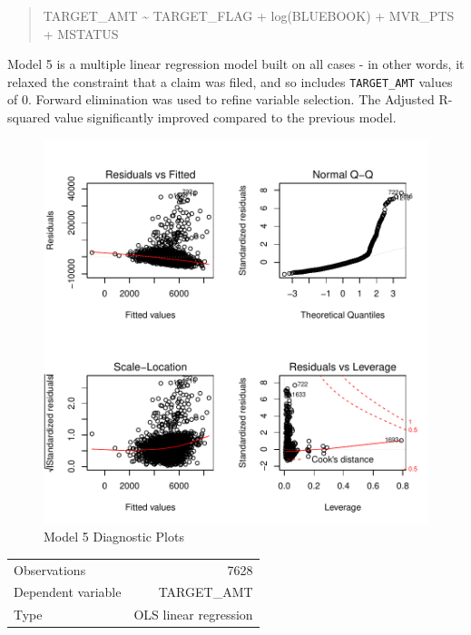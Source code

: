 \documentclass[]{article}
\begin{document}
\begin{quote}
TARGET\_AMT \textasciitilde{} TARGET\_FLAG + log(BLUEBOOK) + MVR\_PTS +
MSTATUS
\end{quote}

Model 5 is a multiple linear regression model built on all cases - in
other words, it relaxed the constraint that a claim was filed, and so
includes \texttt{TARGET\_AMT} values of 0. Forward elimination was used
to refine variable selection. The Adjusted R-squared value significantly
improved compared to the previous model.

\begin{figure}
\centering
\includegraphics{proj4_files/figure-latex/f15-1.pdf}
\caption{\label{fig:f15}Model 5 Diagnostic Plots}
\end{figure}

\newpage

\begin{table}[!h]
\centering
\begin{tabular}{lr}
\toprule
\rowcolor{gray!6}  Observations & 7628\\
Dependent variable & TARGET\_AMT\\
\rowcolor{gray!6}  Type & OLS linear regression\\
\bottomrule
\end{tabular}
\end{table}
\end{document}
